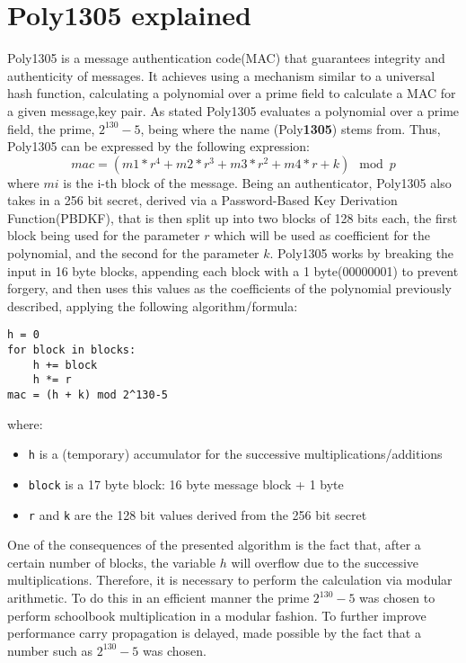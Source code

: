 \documentclass[twocolumn]{article}
\begin{document}
\section{Poly1305 explained}
\label{poly135_101}
Poly1305 is a message authentication code(MAC) that guarantees integrity and authenticity of messages. It achieves using a mechanism similar to a universal hash function,
calculating a polynomial over a prime field to calculate a MAC for a given message,key pair. As stated Poly1305 evaluates a polynomial over a prime field, the prime, $2^{130}-5$, 
being where the name (Poly\textbf{1305}) stems from. Thus, Poly1305 can be expressed by the following expression: 
$$mac = (m1 * r^4 + m2 * r^3 + m3 * r^2 + m4 * r + k) \mod{p} $$ 
where $mi$ is the i-th block of the message. Being an authenticator, Poly1305 also takes in a 256 bit secret, derived via a Password-Based Key Derivation Function(PBDKF), 
that is then split up into two blocks of 128 bits each, the first block being used for the parameter $r$ which will be used as coefficient for the polynomial, and the second 
for the parameter $k$. Poly1305 works by breaking the input in 16 byte blocks, appending each block with a 1 byte(00000001) to prevent forgery, and then uses
this values as the coefficients of the polynomial previously described, applying the following algorithm/formula:

\begin{verbatim}
h = 0
for block in blocks:
    h += block
    h *= r
mac = (h + k) mod 2^130-5
\end{verbatim}

where:
\begin{itemize}
    \item \texttt{h} is a (temporary) accumulator for the successive multiplications/additions
    \item \texttt{block} is a 17 byte block: 16 byte message block + 1 byte
    \item \texttt{r} and \texttt{k} are the 128 bit values derived from the 256 bit secret
\end{itemize}

One of the consequences of the presented algorithm is the fact that, after a certain number of blocks, the variable $h$ will overflow due to the successive multiplications.
Therefore, it is necessary to perform the calculation via modular arithmetic. To do this in an efficient manner the prime $2^{130}-5$ was chosen to perform schoolbook 
multiplication in a modular fashion. To further improve performance carry propagation is delayed, made possible by the fact that a number such as $2^{130}-5$ was chosen.
\end{document}
